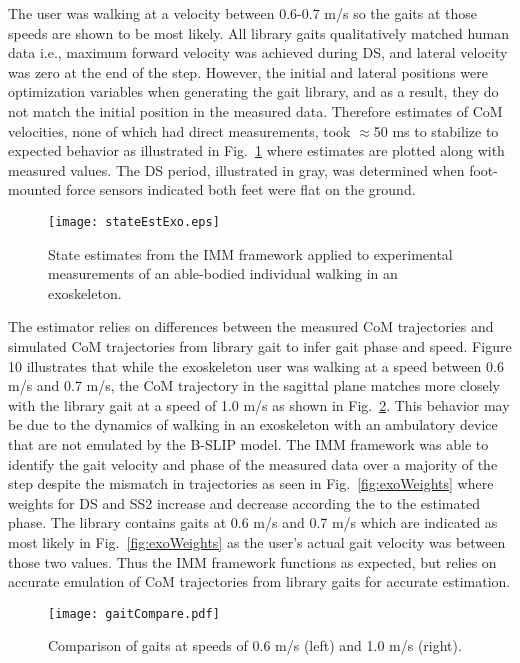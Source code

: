 The user was walking at a velocity between 0.6-0.7 m/s so the gaits at those speeds are shown to be most likely. All library gaits qualitatively matched human data i.e., maximum forward velocity was achieved during DS, and lateral velocity was zero at the end of the step. However, the initial and lateral positions were optimization variables when generating the gait library, and as a result, they do not match the initial position in the measured data. Therefore estimates of CoM velocities, none of which had direct measurements, took $ \approx $50 ms to stabilize to expected behavior as illustrated in Fig.~\ref{fig:exoState} where estimates are plotted along with measured values. The DS period, illustrated in gray, was determined when foot-mounted force sensors indicated both feet were flat on the ground.
\begin{figure}
	\centering
	\texttt{[image: stateEstExo.eps]}
	\caption{State estimates from the IMM framework applied to experimental measurements of an able-bodied individual walking in an exoskeleton.}\label{fig:exoState}
\end{figure}

The estimator relies on differences between the measured CoM trajectories and simulated CoM trajectories from library gait to infer gait phase and speed. Figure 10 illustrates that while the exoskeleton user was walking at a speed between 0.6 m/s and 0.7 m/s, the CoM trajectory in the sagittal plane matches more closely with the library gait at a speed of 1.0 m/s as shown in Fig.~\ref{fig:compare}. This behavior may be due to the dynamics of walking in an exoskeleton with an ambulatory device that are not emulated by the B-SLIP model. The IMM framework was able to identify the gait velocity and phase of the measured data over a majority of the step despite the mismatch in trajectories as seen in Fig.~\ref{fig:exoWeights} where weights for DS and SS2 increase and decrease according the to the estimated phase. The library contains gaits at 0.6 m/s and 0.7 m/s which are indicated as most likely in Fig.~\ref{fig:exoWeights} as the user's actual gait velocity was between those two values. Thus the IMM framework functions as expected, but relies on accurate emulation of CoM trajectories from library gaits for accurate estimation.

\begin{figure}
	\centering
	\texttt{[image: gaitCompare.pdf]}
	\caption{Comparison of gaits at speeds of 0.6 m/s  (left) and 1.0 m/s  (right).}\label{fig:compare}
\end{figure}

